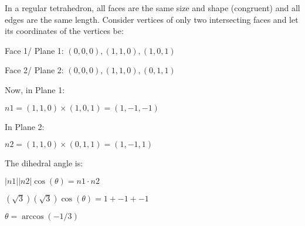 \documentclass[titlepage,12pt]{book}
\begin{document}
\mainmatter

\begin{solution}
    In a regular tetrahedron, all faces are the same size and shape (congruent) and all edges are the same length.
    Consider vertices of only two intersecting faces and let its coordinates of the vertices be:

    Face 1/ Plane 1: $(0,0,0), (1, 1, 0), (1, 0, 1)$

    Face 2/ Plane 2: $(0,0,0), (1, 1, 0), (0, 1, 1)$
    

    Now, in Plane 1:
    
    $n1 = (1, 1, 0) \times (1, 0, 1) = (1, -1, -1)$


    In Plane 2:

    $n2 = (1, 1, 0) \times (0, 1, 1) = (1, -1, 1)$

    The dihedral angle is:

    $|n1||n2| \cos(\theta) = n1 \cdot n2$
    
    $(\sqrt{3}) (\sqrt{3}) \cos(\theta) =  1 + -1 + -1$

    $\theta = \arccos(-1/3)$
\end{solution}


\begin{solution}
\end{solution}


\begin{solution}
\end{solution}
\end{document}
